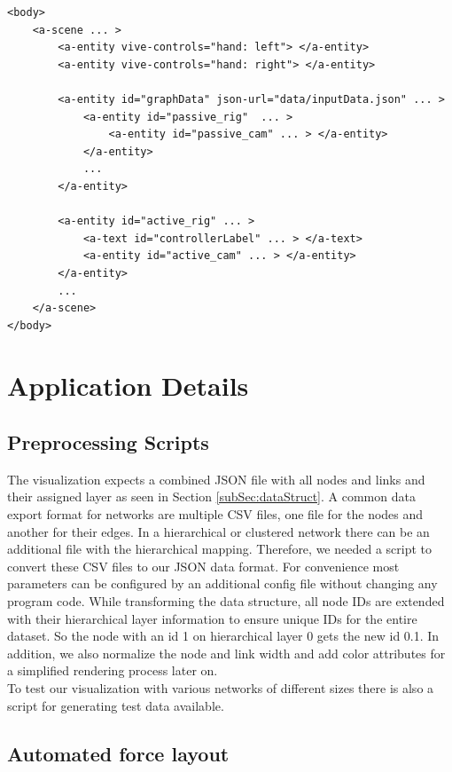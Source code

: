 \begin{lstlisting}[label={lst:virtualSceneGraph},caption=Simplified virtual A-Frame scene graph used by the application.]
<body>
    <a-scene ... >
        <a-entity vive-controls="hand: left"> </a-entity>
        <a-entity vive-controls="hand: right"> </a-entity>
        
        <a-entity id="graphData" json-url="data/inputData.json" ... >
            <a-entity id="passive_rig"  ... >  
                <a-entity id="passive_cam" ... > </a-entity>
            </a-entity>
            ...
        </a-entity>

        <a-entity id="active_rig" ... >
            <a-text id="controllerLabel" ... > </a-text>
            <a-entity id="active_cam" ... > </a-entity>
        </a-entity>
        ...
    </a-scene>
</body>
\end{lstlisting}

\section{Application Details}
\label{sec:applDetails}
\subsection{Preprocessing Scripts}
\label{sec:preprocessing}

The visualization expects a combined JSON file with all nodes and links and their assigned layer as seen in Section \ref{subSec:dataStruct}.
A common data export format for networks are multiple CSV files, one file for the nodes and another for their edges.
In a hierarchical or clustered network there can be an additional file with the hierarchical mapping.
Therefore, we needed a script to convert these CSV files to our JSON data format. For convenience most parameters can be configured by an additional config file without changing any program code. 
While transforming the data structure, all node IDs are extended with their hierarchical layer information to ensure unique IDs for the entire dataset. So the node with an id 1 on hierarchical layer 0 gets the new id 0.1.  
In addition, we also normalize the node and link width and add color attributes for a simplified rendering process later on.\\
To test our visualization with various networks of different sizes there is also a script for generating test data available.

\subsection{Automated force layout}
\label{sec:layoutCalculation}


